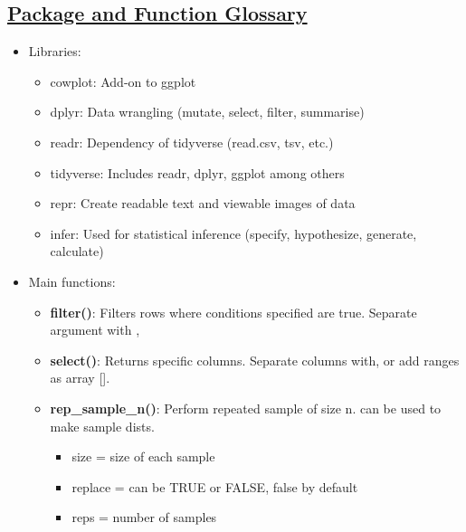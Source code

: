 \documentclass[8pt,landscape,a4paper, fleqn, dvipsnames]{extarticle}
\begin{document}
\begin{multicols*}{4}


\section*{\ul{Package and Function Glossary}}
\begin{itemize}
    \item Libraries:
    \begin{itemize}
        \item cowplot: Add-on to ggplot
        \item dplyr: Data wrangling (mutate, select, filter, summarise)
        \item readr: Dependency of tidyverse (read.csv, tsv, etc.)
        \item tidyverse: Includes readr, dplyr, ggplot among others
        \item repr: Create readable text and viewable images of data
        \item infer: Used for statistical inference (specify, hypothesize, generate, calculate)
    \end{itemize}
    \item Main functions:
    \begin{itemize}
        \item \textbf{filter()}: Filters rows where conditions specified are true. Separate argument with ,
        \item \textbf{select()}: Returns specific columns. Separate columns with, or add ranges as array [].
        \item \textbf{rep\_sample\_n()}: Perform repeated sample of size n. can be used to make sample dists.
        \begin{itemize}
            \item size = size of each sample
            \item replace = can be TRUE or FALSE, false by default
            \item reps = number of samples

\end{itemize}
\end{itemize}
\end{itemize}
\end{multicols*}
\end{document}
